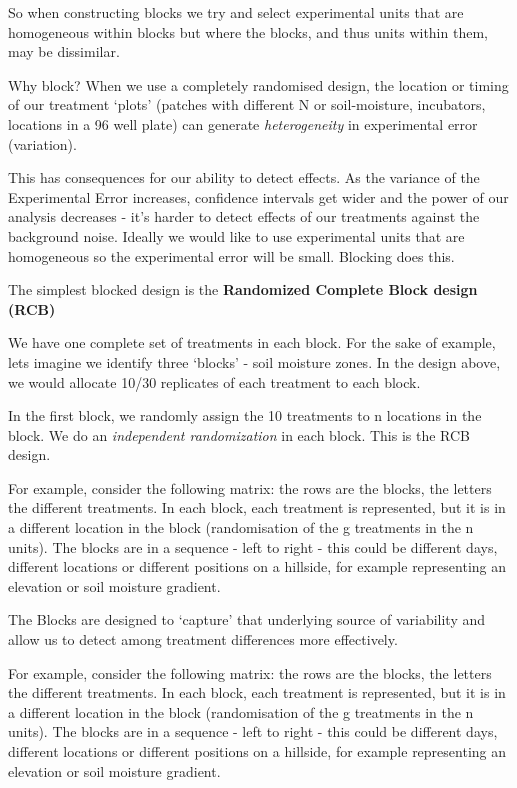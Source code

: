 \documentclass[
]{book}
\begin{document}
So when constructing blocks we try and select experimental units that are homogeneous within blocks but where the blocks, and thus units within them, may be dissimilar.

Why block? When we use a completely randomised design, the location or timing of our treatment `plots' (patches with different N or soil-moisture, incubators, locations in a 96 well plate) can generate \emph{heterogeneity} in experimental error (variation).

This has consequences for our ability to detect effects. As the variance of the Experimental Error increases, confidence intervals get wider and the power of our analysis decreases - it's harder to detect effects of our treatments against the background noise. Ideally we would like to use experimental units that are homogeneous so the experimental error will be small. Blocking does this.

The simplest blocked design is the \textbf{Randomized Complete Block design (RCB)}

We have one complete set of treatments in each block. For the sake of example, lets imagine we identify three `blocks' - soil moisture zones. In the design above, we would allocate 10/30 replicates of each treatment to each block.

In the first block, we randomly assign the 10 treatments to n locations in the block. We do an \emph{independent randomization} in each block. This is the RCB design.

For example, consider the following matrix: the rows are the blocks, the letters the different treatments. In each block, each treatment is represented, but it is in a different location in the block (randomisation of the g treatments in the n units). The blocks are in a sequence - left to right - this could be different days, different locations or different positions on a hillside, for example representing an elevation or soil moisture gradient.

The Blocks are designed to `capture' that underlying source of variability and allow us to detect among treatment differences more effectively.

For example, consider the following matrix: the rows are the blocks, the letters the different treatments. In each block, each treatment is represented, but it is in a different location in the block (randomisation of the g treatments in the n units). The blocks are in a sequence - left to right - this could be different days, different locations or different positions on a hillside, for example representing an elevation or soil moisture gradient.
\end{document}
